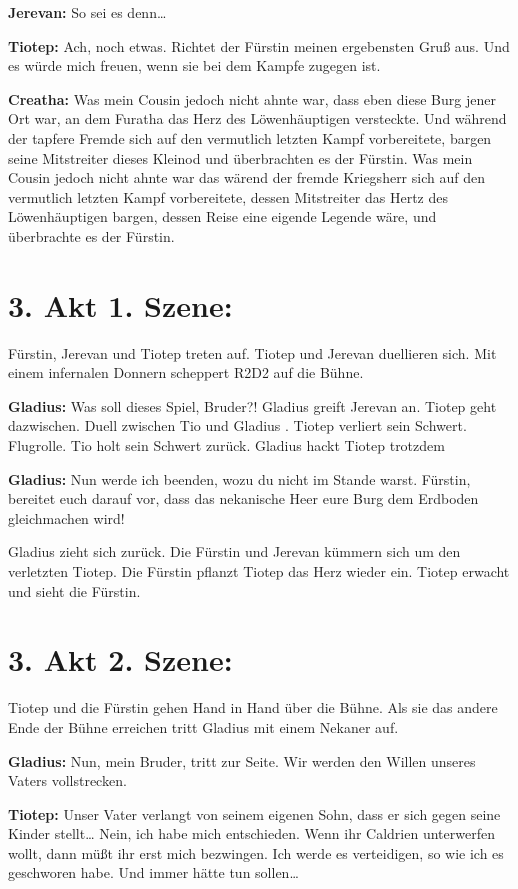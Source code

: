 \documentclass[a5paper,6pt]{book}
\begin{document}
\textbf{Jerevan:} So sei es denn…

\textbf{Tiotep:} Ach, noch etwas. Richtet der Fürstin meinen ergebensten Gruß aus. Und es
würde mich freuen, wenn sie bei dem Kampfe zugegen ist.

\textbf{Creatha:} Was mein Cousin jedoch nicht ahnte war, dass eben diese Burg jener Ort war,
an dem Furatha das Herz des Löwenhäuptigen versteckte. Und während der tapfere
Fremde sich auf den vermutlich letzten Kampf vorbereitete, bargen seine Mitstreiter
dieses Kleinod und überbrachten es der Fürstin.
Was mein Cousin jedoch nicht ahnte war das wärend der fremde Kriegsherr sich
auf den vermutlich letzten Kampf vorbereitete, dessen Mitstreiter das Hertz des
Löwenhäuptigen bargen, dessen Reise eine eigende Legende wäre, und überbrachte es
der Fürstin.

\section{3. Akt 1. Szene:}

Fürstin, Jerevan und Tiotep treten auf. Tiotep und Jerevan duellieren sich. Mit einem
infernalen Donnern scheppert R2D2 auf die Bühne.

\textbf{Gladius:} Was soll dieses Spiel, Bruder?!
Gladius greift Jerevan an. Tiotep geht dazwischen. Duell zwischen Tio und Gladius . Tiotep
verliert sein Schwert. Flugrolle. Tio holt sein Schwert zurück. Gladius hackt Tiotep trotzdem

\textbf{Gladius:} Nun werde ich beenden, wozu du nicht im Stande warst. Fürstin, bereitet euch
darauf vor, dass das nekanische Heer eure Burg dem Erdboden gleichmachen wird!

Gladius zieht sich zurück. Die Fürstin und Jerevan kümmern sich um den verletzten Tiotep.
Die Fürstin pflanzt Tiotep das Herz wieder ein. Tiotep erwacht und sieht die Fürstin.

\section{3. Akt 2. Szene:}

Tiotep und die Fürstin gehen Hand in Hand über die Bühne. Als sie das andere Ende der
Bühne erreichen tritt Gladius mit einem Nekaner auf.

\textbf{Gladius:} Nun, mein Bruder, tritt zur Seite. Wir werden den Willen unseres Vaters
vollstrecken.

\textbf{Tiotep:} Unser Vater verlangt von seinem eigenen Sohn, dass er sich gegen seine Kinder
stellt… Nein, ich habe mich entschieden. Wenn ihr Caldrien unterwerfen wollt, dann müßt ihr
erst mich bezwingen. Ich werde es verteidigen, so wie ich es geschworen habe. Und immer
hätte tun sollen…
\end{document}

